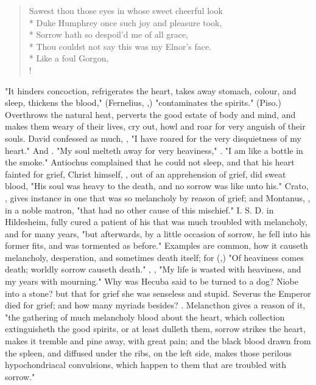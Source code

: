 \begin{verse}%
Sawest thou those eyes in whose sweet cheerful look\\*
Duke Humphrey once such joy and pleasure took,\\*
Sorrow hath so despoil'd me of all grace,\\*
Thou couldst not say this was my Elnor's face.\\*
Like a foul Gorgon, \etc{}\\!
\end{verse}%

"It hinders concoction, refrigerates the heart, takes away
stomach, colour, and sleep, thickens the blood,"
(Fernelius, ,) "contaminates the spirits." (Piso.) Overthrows
the natural heat, perverts the good estate of body and mind, and makes them
weary of their lives, cry out, howl and roar for very anguish of their souls.
David confessed as much, , "I have roared for
the very disquietness of my heart." And .
"My soul melteth away for very heaviness," . "I am like a bottle
in the smoke." Antiochus complained that he could not sleep, and that his heart
fainted for grief, Christ himself, , out
of an apprehension of grief, did sweat blood,  "His
soul was heavy to the death, and no sorrow was like unto his." Crato,
, gives instance in one that was so
melancholy by reason of grief; and Montanus,
, in a noble matron,
"that had no other cause of this mischief." I. S. D. in
Hildesheim, fully cured a patient of his that was much troubled with
melancholy, and for many years, "but afterwards, by a
little occasion of sorrow, he fell into his former fits, and was tormented as
before." Examples are common, how it causeth melancholy,
desperation, and sometimes death itself; for
(,) "Of heaviness comes death; worldly sorrow
causeth death." , ,
"My life is wasted with heaviness, and my years with mourning." Why was Hecuba
said to be turned to a dog? Niobe into a stone? but that for grief she was
senseless and stupid. Severus the Emperor died for grief;
and how many myriads besides? . Melancthon gives a reason of
it, "the gathering of much melancholy blood about the
heart, which collection extinguisheth the good spirits, or at least dulleth
them, sorrow strikes the heart, makes it tremble and pine away, with great
pain; and the black blood drawn from the spleen, and diffused under the ribs,
on the left side, makes those perilous hypochondriacal convulsions, which
happen to them that are troubled with sorrow."

